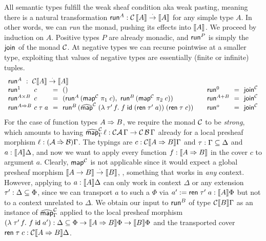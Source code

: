 \documentclass[a4paper,USenglish,cleveref, autoref]{lipics-v2019}
\begin{document}
All semantic types fulfill the weak sheaf condition aka weak pasting,
meaning there is
a natural transformation $\trun^A : \C\,\den A \todot \den A$ for any simple
type $A$.  In other words, we can \emph{run} the monad, pushing its
effects into $\den A$.  We proceed by induction on $A$.
Positive types $P$ are already monadic,
and $\trun^P$ is simply the $\tjoin$ of the monad $\C$.
At negative types we can recurse pointwise at a smaller type,
exploiting that values of negative types are essentially
(finite or infinite) tuples.
\[
\begin{array}{l@{~}l@{~~}c@{~~}l@{\qquad}l@{~~}c@{~~}l}
  \multicolumn 7 l {\trun^A ~:~ \C \den A \todot \den A} \\
  \trun^{\tyone} & c & = & \ttempty
    &
  \trun^{\tyzero} & = & \tjoin[\C]
    \\
  \trun^{A \times B} & c & = &
      (\trun^A\,(\tmap[\C]\;\pi_1\;c),\
       \trun^B\,(\tmap[\C]\;\pi_2\;c))
    &
  \trun^{A + B}   & = & \tjoin[\C]
  \\
  \trun^{A \To B} & c \; \tau \; a & = & \trun^B\,
      (\stmap[\C]\;(\lambda\;\tau'\,f.\;f\;\tid\;(\tren\;\tau'\;a))\;(\tren\;\tau\;c))
    &
  \trun^{o}      & = & \tjoin[\C]
\\
\end{array}
\]
For the case of function types $A \To B$, we require the monad $\C$ to be
\emph{strong}, which amounts to having
$\stmap[\C]_\Gamma\, \ell : \C\A\,\Gamma \to \C\,\B\,\Gamma$ already for
a local presheaf morphism $\ell : (\A \hatto \B)\Gamma$.
The typings are
$c : \C \den{A \To B} \Gamma$ and
$\tau : \Gamma \sublist \Delta$ and
$a : \den A \Delta$, and now we want to apply every function
$f : \den{A \To B}$ in the cover $c$ to argument $a$.  Clearly,
$\tmap[\C]$ is not applicable since it would expect a
global presheaf morphism
$\den{A \to B} \todot \den B$, \ie, something that works in \emph{any}
context.  However, applying to $a : \den A \Delta$ can only work in
context $\Delta$ or any extension $\tau' : \Delta \sublist \Phi$,
since we can transport $a$ to such a $\Phi$ via
$a' := \tren\; \tau'\; a : \den A \Phi$ but not to a context unrelated to
$\Delta$.  We obtain our input to $\trun^B$ of type $\C \den B \Gamma$
as an instance of $\stmap[\C]_\Gamma$ applied to the local presheaf morphism
$(\lambda \; \tau'\, f. \  f\;\tid\;a') :
\Delta \sublist \Phi \to  \den{A \To B}\Phi \to \den B \Phi$
and the transported cover $\tren\;\tau\;c : \C\den{A \To B}\Delta$.
\end{document}
